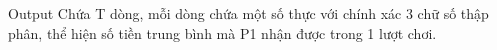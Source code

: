 Output  
Chứa T dòng, mỗi dòng chứa một số thực với chính xác 3 chữ số thập phân, thể hiện số tiền trung bình mà P1 nhận được trong 1 lượt chơi.